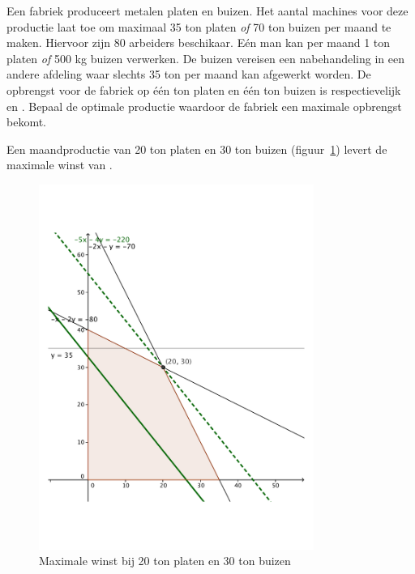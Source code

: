 \begin{oef}
Een fabriek produceert metalen platen en buizen.
Het aantal machines voor deze productie laat toe om maximaal 35
ton platen \emph{of} 70 ton buizen per maand te maken. Hiervoor zijn 80
arbeiders beschikaar. E\'en man kan per maand 1 ton platen \emph{of} 500
kg buizen verwerken. De buizen vereisen een nabehandeling in een
andere afdeling waar slechts 35 ton per maand kan afgewerkt
worden.   De opbrengst voor de fabriek op \'e\'en ton platen en
\'e\'en ton buizen is respectievelijk  en
. Bepaal  de optimale
productie waardoor de fabriek een maximale opbrengst bekomt. 
\begin{opl}
Een maandproductie van 20 ton platen en 30 ton buizen (figuur~\ref{fig:platenbuizen}) levert de maximale winst van .
                 \begin{figure}[hbtp]
\centering
\includegraphics[width=0.8\textwidth]{oefeningen/FigurenLP/OefPlatenBuizen.pdf}
\caption{Maximale winst bij 20 ton platen en 30 ton buizen}
\label{fig:platenbuizen}
\end{figure}
\clearpage
     \end{opl}
\end{oef}
     


